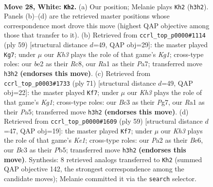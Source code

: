 \documentclass[11pt]{article}
\begin{document}
\clearpage

\begin{figure}[p]\centering
\begin{subfigure}{0.46\textwidth}\centering
\resizebox{\linewidth}{!}{%
\newchessgame
\chessboard[
  setfen={rn3k2/8/p7/3R1pr1/1P6/2B4K/P3bP2/R7 w - - 0 28},
  showmover=false,
  pgfstyle=straightmove, color=movearrow, markmove={h3-h2}
]}
\caption{}
\end{subfigure}\hfill
\begin{subfigure}{0.46\textwidth}\centering
\resizebox{\linewidth}{!}{%
\newchessgame
\chessboard[
  setfen={2r3k1/p2b4/5p2/np1P4/4PR2/3B4/PK1N4/8 b - - 0 30},
  showmover=false,
  pgfstyle=straightmove, color=movearrow, markmove={g8-g7}
]}
\caption{}
\end{subfigure}
\\[4pt]
\begin{subfigure}{0.46\textwidth}\centering
\resizebox{\linewidth}{!}{%
\newchessgame
\chessboard[
  setfen={6k1/6p1/5p2/pr6/7P/bPR1BP1K/5P2/8 b - - 3 36},
  showmover=false,
  pgfstyle=straightmove, color=movearrow, markmove={g8-f7}
]}
\caption{}
\end{subfigure}\hfill
\begin{subfigure}{0.46\textwidth}\centering
\resizebox{\linewidth}{!}{%
\newchessgame
\chessboard[
  setfen={4k3/6B1/p3b3/1p1pPp2/7P/P1r5/5PP1/R5K1 b - - 1 30},
  showmover=false,
  pgfstyle=straightmove, color=movearrow, markmove={e8-f7}
]}
\caption{}
\end{subfigure}
\caption{\textbf{Move 28, White: \texttt{Kh2}.} (a) Our position; Melanie plays \texttt{Kh2} (\texttt{h3h2}). Panels (b)--(d) are the retrieved master positions whose correspondence most drove this move (highest QAP objective among those that transfer to it). (b) Retrieved from \texttt{ccrl\_top\_p0000\#1114} (ply 59) [structural distance $d$=49, QAP obj=29]: the master played \texttt{Kg7}; under $\mu$ our \emph{Kh3} plays the role of that game's \emph{Kg1}; cross-type roles: our \emph{b}e2 as their \emph{R}c8, our \emph{R}a1 as their \emph{P}a7; transferred move \texttt{h3h2} \textbf{(endorses this move)}. (c) Retrieved from \texttt{ccrl\_top\_p0003\#1733} (ply 71) [structural distance $d$=49, QAP obj=22]: the master played \texttt{Kf7}; under $\mu$ our \emph{Kh3} plays the role of that game's \emph{Kg1}; cross-type roles: our \emph{B}c3 as their \emph{P}g7, our \emph{R}a1 as their \emph{P}a5; transferred move \texttt{h3h2} \textbf{(endorses this move)}. (d) Retrieved from \texttt{ccrl\_top\_p0000\#1609} (ply 59) [structural distance $d$=47, QAP obj=19]: the master played \texttt{Kf7}; under $\mu$ our \emph{Kh3} plays the role of that game's \emph{Ke1}; cross-type roles: our \emph{P}a2 as their \emph{B}e6, our \emph{B}c3 as their \emph{P}b5; transferred move \texttt{h3h2} \textbf{(endorses this move)}. Synthesis: 8 retrieved analogs transferred to \texttt{Kh2} (summed QAP objective 142, the strongest correspondence among the candidate moves); Melanie committed it via the \texttt{search} selector.}
\label{fig:thought-m54}
\end{figure}
\end{document}
